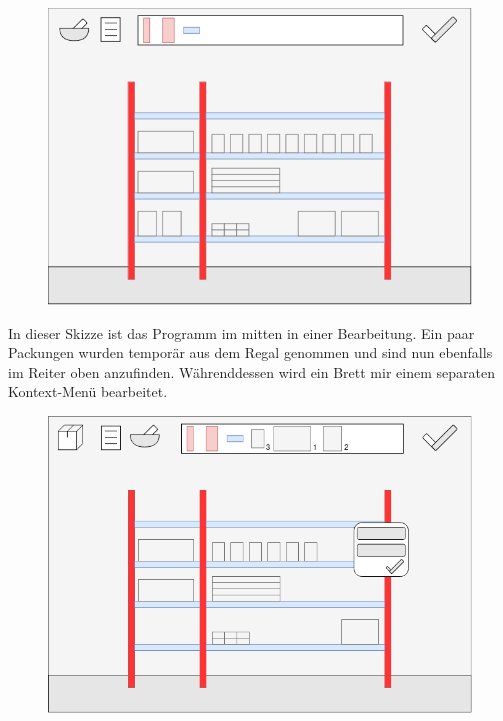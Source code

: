 \endgroup
\begin{figure}[h!]
    \includegraphics[width=\linewidth]{images/GUI-Skizze_Regal-Bearbeiten-Modus.drawio.png}
\end{figure}
\newpage
\begingroup
In dieser Skizze ist das Programm im mitten in einer Bearbeitung. Ein paar Packungen wurden temporär aus dem Regal genommen
und sind nun ebenfalls im Reiter oben anzufinden. Währenddessen wird ein Brett mir einem separaten Kontext-Menü bearbeitet.
\endgroup
\begin{figure}[h!]
    \includegraphics[width=\linewidth]{images/GUI-Skizze_Im-Bearbeiten.png}
\end{figure}